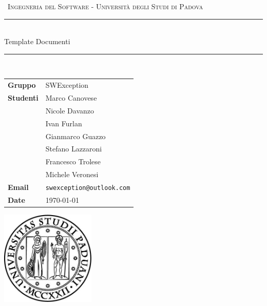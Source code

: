 \documentclass[12pt,english,openany,a4paper]{book}
\begin{document}
	
	
	\begin{titlepage}
		\clearpage\thispagestyle{empty}
		\centering
		\vspace{1cm}
		
		{\
			\textsc{Ingegneria del Software - Università degli Studi di Padova}
		}
		\vspace{2.5cm}
		
		\rule{\linewidth}{2mm} \\[0.8cm]
		{ \LARGE \sc Template Documenti}\\[0.55cm]
		\rule{\linewidth}{0.6mm} \\[3.4cm]
		
		\hspace{2cm}
		\begin{tabular}{l p{5cm}}
			\textbf{Gruppo} & SWException \\[10pt]
			\textbf{Studenti} & Marco Canovese \\ & Nicole Davanzo \\ & Ivan Furlan \\ & Gianmarco Guazzo \\ & Stefano Lazzaroni \\ & Francesco Trolese \\ & Michele Veronesi \\[10pt]
			\textbf{Email} & \texttt{swexception@outlook.com} \\[10pt]
			\textbf{Date} & \today \\            
		\end{tabular}
		
		
		\vfill
		\centering \includegraphics[width=4.5cm]{logo.jpg}\\ %
		\vspace{0.5cm}
	\end{titlepage}
	\tableofcontents
	
	\newpage
	
\end{document}
